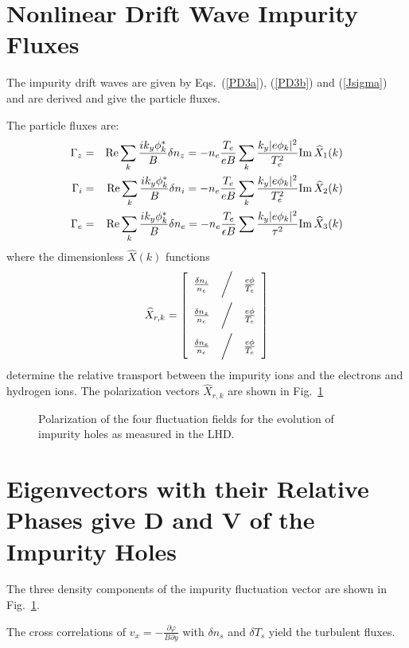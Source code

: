 \documentclass[a4paper,openany,12pt]{book}
\def\dsp{{\displaystyle}}
\begin{document}
\section{Nonlinear Drift Wave Impurity Fluxes}

The impurity drift waves are given by Eqs.~(\ref{PD3a}), (\ref{PD3b}) and (\ref{Jsigma}) and are derived and give the particle fluxes.

The particle fluxes are:
\begin{eqnarray*}
\Gamma_z&=&{\rm Re}\sum_k\frac{ik_y\phi_k^*}{B}\delta n_z=-n_e\frac{T_e}{eB}\sum_k\frac{k_y|e\phi_k|^2}{T_e^2}{\rm Im}\,\widehat X_1(k)\\
\Gamma_i&=&{\rm Re}\sum_k\frac{ik_y\phi_k^*}{B}\delta n_i=-n_e\frac{T_e}{eB}\sum_k\frac{k_y|e\phi_k|^2}{T_e^2}{\rm Im}\,\widehat X_2(k)\\
\Gamma_e&=&{\rm Re}\sum_k\frac{ik_y\phi_k^*}{B}\delta n_e=-n_e\frac{T_e}
{\epsilon B}\sum\frac{k_y|e\phi_k|^2}{\tau^2}{\rm Im}\,\widehat X_3(k)
\end{eqnarray*}
where the dimensionless $\widehat X(k)$ functions
$$\widehat X_{r,k}=\left[\begin{array}{ccc}
\dsp{\delta n_i\over n_e} &\bigg/ &\dsp{e\phi\over T_e}\\[10pt]
\dsp{\delta n_z\over n_e} &\bigg/ &\dsp{e\phi\over T_e}\\[10pt]
\dsp{\delta n_e\over n_e} &\bigg/ &\dsp{e\phi\over T_e}\end{array}\right]$$
determine the relative transport between the impurity ions and the electrons and hydrogen ions. The polarization vectors $\widehat X_{r,k}$ are shown in Fig.~\ref{F9.27}
%
\begin{figure}[H]
\centerline{}
\caption{  Polarization of the four fluctuation fields for the evolution of impurity holes as measured in the LHD.}
\label{F9.27}
\end{figure}
%
\section{Eigenvectors with their Relative Phases give D and V of the Impurity Holes}

The three density components of the impurity fluctuation vector are shown in Fig.~\ref{F9.27}.

The cross correlations of $v_x=-\frac{\partial\varphi}{B\partial y}$ with $\delta n_s$ and $\delta T_s$ yield the turbulent fluxes.
\end{document}
